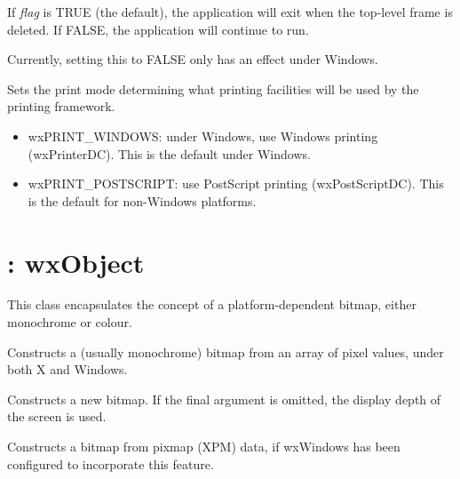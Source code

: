 \label{wxappsetexitondelete}


If {\it flag} is TRUE (the default), the application will exit when the top-level frame is
deleted. If FALSE, the application will continue to run.

Currently, setting this to FALSE only has an effect under Windows.

\label{wxappsetprintmode}


Sets the print mode determining what printing facilities will be
used by the printing framework.

\begin{itemize}\itemsep=0pt
\item wxPRINT\_WINDOWS: under Windows, use Windows printing (wxPrinterDC). This is the
default under Windows.
\item wxPRINT\_POSTSCRIPT: use PostScript printing (wxPostScriptDC). This is the
default for non-Windows platforms.
\end{itemize}

\section{: wxObject}\label{wxbitmap}


This class encapsulates the concept of a platform-dependent bitmap,
either monochrome or colour.



Constructs a (usually monochrome) bitmap from an array of pixel values, under both
X and Windows.


Constructs a new bitmap. If the final argument is omitted, the display depth of
the screen is used.


Constructs a bitmap from pixmap (XPM) data, if wxWindows has been configured
to incorporate this feature.

